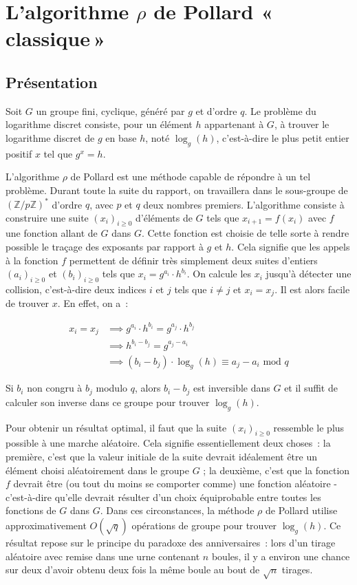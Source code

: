 \chapter{L'algorithme \texorpdfstring{$\rho$}{Rho} de Pollard «\texorpdfstring{\,}{\ }classique\texorpdfstring{\,}{\ }»}
    	\section{Présentation}
      Soit $G$ un groupe fini, cyclique, généré par $g$ et d'ordre $q$. Le problème du logarithme discret consiste, pour un élément $h$ appartenant à $G$, à trouver le logarithme discret de $g$ en base $h$, noté $\log_g(h)$, c'est-à-dire le plus petit entier positif $x$ tel que $g^x = h$.

    	L'algorithme $\rho$ de Pollard est une méthode capable de répondre à un tel problème. Durant toute la suite du rapport, on travaillera dans le sous-groupe de $(\mathbb{Z}/p\mathbb{Z})^*$ d'ordre $q$, avec $p$ et $q$ deux nombres premiers. L'algorithme consiste à construire une suite $(x_i)_{i \ge 0}$ d'éléments de $G$ tels que $x_{i+1} = f(x_i)$ avec $f$ une fonction allant de $G$ dans $G$. Cette fonction est choisie de telle sorte à rendre possible le traçage des exposants par rapport à $g$ et $h$. Cela signifie que les appels à la fonction $f$ permettent de définir très simplement deux suites d'entiers $(a_i)_{i \ge 0}$ et $(b_i)_{i \ge 0}$ tels que $x_i = g^{a_i} \cdot h^{b_i}$. On calcule les $x_i$ jusqu'à détecter une collision, c'est-à-dire deux indices $i$ et $j$ tels que $i \ne j$ et $x_i = x_j$. Il est alors facile de trouver $x$. En effet, on a~:

    	\begin{align*}
        x_i = x_j &\implies g^{a_i} \cdot h^{b_i} = g^{a_j} \cdot h^{b_j} \\
                  &\implies h^{b_i - b_j} = g^{a_j - a_i} \\
                  &\implies (b_i - b_j) \cdot \log_g(h) \equiv a_j - a_i \text{\ mod } q
      \end{align*}

      Si $b_i$ non congru à $b_j$ modulo $q$, alors $b_i - b_j$ est inversible dans $G$ et il suffit de calculer son inverse dans ce groupe pour trouver $\log_g(h)$.

      Pour obtenir un résultat optimal, il faut que la suite $(x_i)_{i \ge 0}$ ressemble le plus possible à une marche aléatoire. Cela signifie essentiellement deux choses~: la première, c'est que la valeur initiale de la suite devrait idéalement être un élément choisi aléatoirement dans le groupe $G$ ; la deuxième, c'est que la fonction $f$ devrait être (ou tout du moins se comporter comme) une fonction aléatoire - c'est-à-dire qu'elle devrait résulter d'un choix équiprobable entre toutes les fonctions de $G$ dans $G$. Dans ces circonstances, la méthode $\rho$ de Pollard utilise approximativement $O(\sqrt{q})$ opérations de groupe pour trouver $\log_g(h)$. Ce résultat repose sur le principe du paradoxe des anniversaires~: lors d'un tirage aléatoire avec remise dans une urne contenant $n$ boules, il y a environ une chance sur deux d'avoir obtenu deux fois la même boule au bout de $\sqrt{n}$ tirages.

